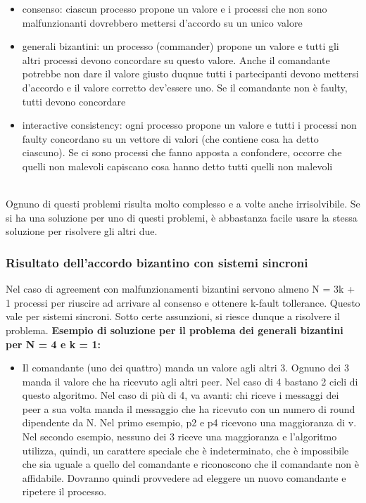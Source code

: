 \begin{itemize}
    \item consenso: ciascun processo propone un valore e i processi che non sono malfunzionanti dovrebbero mettersi d'accordo su un unico valore
    \item generali bizantini: un processo (commander) propone un valore e tutti gli altri processi devono concordare su questo valore. Anche il comandante potrebbe non dare il valore giusto duqnue tutti i partecipanti devono mettersi d'accordo e il valore corretto dev'essere uno. Se il comandante non è faulty, tutti devono concordare
    \item interactive consistency: ogni processo propone un valore e tutti i processi non faulty concordano su un vettore di valori (che contiene cosa ha detto ciascuno). Se ci sono processi che fanno apposta a confondere, occorre che quelli non malevoli capiscano cosa hanno detto tutti quelli non malevoli

\end{itemize}

\phantom \\

Ognuno di questi problemi risulta molto complesso e a volte anche irrisolvibile. Se si ha una soluzione per uno di questi problemi, è abbastanza facile usare la stessa soluzione per risolvere gli altri due.

\subsubsection{Risultato dell'accordo bizantino con sistemi sincroni}
Nel caso di agreement con malfunzionamenti bizantini servono almeno N = 3k + 1 processi per riuscire ad arrivare al consenso e ottenere k-fault tollerance. Questo vale per sistemi sincroni. Sotto certe assunzioni, si riesce dunque a risolvere il problema.
\newline
\newline
\textbf{Esempio di soluzione per il problema dei generali bizantini per N = 4 e k = 1:} 
\begin{itemize}
    \item Il comandante (uno dei quattro) manda un valore agli altri 3. Ognuno dei 3 manda il valore che ha ricevuto agli altri peer. Nel caso di 4 bastano 2 cicli di questo algoritmo. Nel caso di più di 4, va avanti: chi riceve i messaggi dei peer a sua volta manda il messaggio che ha ricevuto con un numero di round dipendente da N. Nel primo esempio, p2 e p4 ricevono una maggioranza di v. Nel secondo esempio, nessuno dei 3 riceve una maggioranza e l'algoritmo utilizza, quindi, un carattere speciale che è indeterminato, che è impossibile che sia uguale a quello del comandante e riconoscono che il comandante non è affidabile. Dovranno quindi provvedere ad eleggere un nuovo comandante e ripetere il processo.
\end{itemize}

